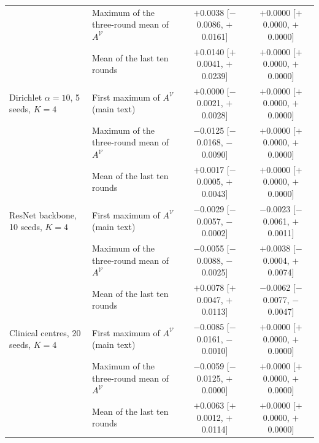 \begin{tabular}{@{}llcc@{}}
 & Maximum of the three-round mean of $A^{\mathcal V}$ & \ensuremath{+}0.0038 [\ensuremath{-}0.0086, \ensuremath{+}0.0161] & \ensuremath{+}0.0000 [\ensuremath{+}0.0000, \ensuremath{+}0.0000]\\
 & Mean of the last ten rounds & \ensuremath{+}0.0140 [\ensuremath{+}0.0041, \ensuremath{+}0.0239] & \ensuremath{+}0.0000 [\ensuremath{+}0.0000, \ensuremath{+}0.0000]\\
\midrule
Dirichlet $\alpha=10$, 5 seeds, $K=4$ & First maximum of $A^{\mathcal V}$ (main text) & \ensuremath{+}0.0000 [\ensuremath{-}0.0021, \ensuremath{+}0.0028] & \ensuremath{+}0.0000 [\ensuremath{+}0.0000, \ensuremath{+}0.0000]\\
 & Maximum of the three-round mean of $A^{\mathcal V}$ & \ensuremath{-}0.0125 [\ensuremath{-}0.0168, \ensuremath{-}0.0090] & \ensuremath{+}0.0000 [\ensuremath{+}0.0000, \ensuremath{+}0.0000]\\
 & Mean of the last ten rounds & \ensuremath{+}0.0017 [\ensuremath{-}0.0005, \ensuremath{+}0.0043] & \ensuremath{+}0.0000 [\ensuremath{+}0.0000, \ensuremath{+}0.0000]\\
\midrule
ResNet backbone, 10 seeds, $K=4$ & First maximum of $A^{\mathcal V}$ (main text) & \ensuremath{-}0.0029 [\ensuremath{-}0.0057, \ensuremath{-}0.0002] & \ensuremath{-}0.0023 [\ensuremath{-}0.0061, \ensuremath{+}0.0011]\\
 & Maximum of the three-round mean of $A^{\mathcal V}$ & \ensuremath{-}0.0055 [\ensuremath{-}0.0088, \ensuremath{-}0.0025] & \ensuremath{+}0.0038 [\ensuremath{-}0.0004, \ensuremath{+}0.0074]\\
 & Mean of the last ten rounds & \ensuremath{+}0.0078 [\ensuremath{+}0.0047, \ensuremath{+}0.0113] & \ensuremath{-}0.0062 [\ensuremath{-}0.0077, \ensuremath{-}0.0047]\\
\midrule
Clinical centres, 20 seeds, $K=4$ & First maximum of $A^{\mathcal V}$ (main text) & \ensuremath{-}0.0085 [\ensuremath{-}0.0161, \ensuremath{-}0.0010] & \ensuremath{+}0.0000 [\ensuremath{+}0.0000, \ensuremath{+}0.0000]\\
 & Maximum of the three-round mean of $A^{\mathcal V}$ & \ensuremath{-}0.0059 [\ensuremath{-}0.0125, \ensuremath{+}0.0000] & \ensuremath{+}0.0000 [\ensuremath{+}0.0000, \ensuremath{+}0.0000]\\
 & Mean of the last ten rounds & \ensuremath{+}0.0063 [\ensuremath{+}0.0012, \ensuremath{+}0.0114] & \ensuremath{+}0.0000 [\ensuremath{+}0.0000, \ensuremath{+}0.0000]\\
\bottomrule
\end{tabular}
